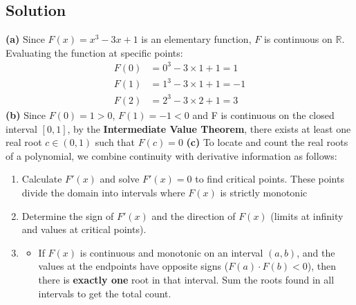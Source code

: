 \subsection*{Solution}
\textbf{(a)}
Since $F(x)=x^3-3x+1$ is an elementary function, $F$ is continuous on $\mathbb{R}$.\\
Evaluating the function at specific points:
\[
\begin{aligned}
F(0) &= 0^3 - 3\times1 + 1 = 1 \\
F(1) &= 1^3 - 3\times1 + 1 = -1 \\
F(2) &= 2^3 - 3\times2 + 1 = 3
\end{aligned}
\]
\textbf{(b)}
Since $F(0)=1>0$, $F(1)=-1<0$ and F is continuous on the closed interval $[0, 1]$, by the \textbf{Intermediate Value Theorem}, there exists at least one real root $c \in (0, 1)$ such that $F(c) = 0$
\textbf{(c)}
To locate and count the real roots of a polynomial, we combine continuity with derivative information as follows:
\begin{enumerate}
    \item Calculate $F'(x)$ and solve $F'(x)=0$ to find critical points. These points divide the domain into intervals where $F(x)$ is strictly monotonic
    \item Determine the sign of $F'(x)$ and the direction of $F(x)$ (limits at infinity and values at critical points).
    \item 
    \begin{itemize}
        \item If $F(x)$ is continuous and monotonic on an interval $(a, b)$, and the values at the endpoints have opposite signs ($F(a) \cdot F(b) < 0$), then there is \textbf{exactly one} root in that interval. Sum the roots found in all intervals to get the total count.
    \end{itemize}
\end{enumerate}

